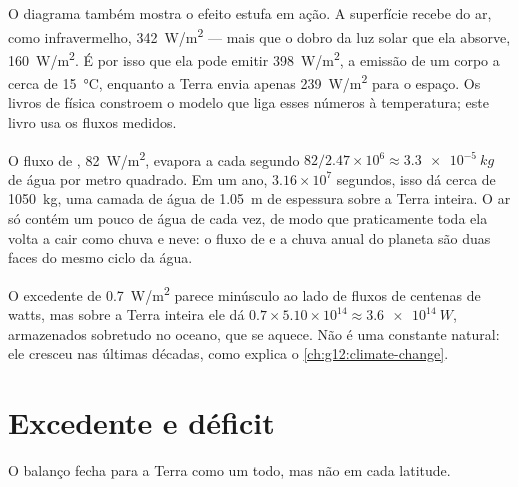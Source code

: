 O diagrama também mostra o efeito estufa em ação. A superfície recebe do
ar, como infravermelho, \qty{342}{W/m^2} --- mais que o dobro da luz solar
que ela absorve, \qty{160}{W/m^2}. É por isso que ela pode emitir
\qty{398}{W/m^2}, a emissão de um corpo a cerca de \qty{15}{\degreeCelsius},
enquanto a Terra envia apenas \qty{239}{W/m^2} para o espaço. Os livros de
física constroem o modelo que liga esses números à temperatura; este livro
usa os fluxos medidos.

\begin{example}\label{ex:g10:earth-energy-budget:evaporation}
O fluxo de , \qty{82}{W/m^2}, evapora a cada segundo
$82/2.47\times
10^6 \approx \qty{3.3e-5}{kg}$ de água por metro quadrado.
Em um ano, $3.16\times10^7$ segundos, isso dá cerca de \qty{1050}{kg}, uma
camada de água de \qty{1.05}{m} de espessura sobre a Terra inteira. O ar
só contém um pouco de água de cada vez, de modo que praticamente toda ela
volta a cair como chuva e neve: o fluxo de  e a chuva anual do
planeta são duas faces do mesmo ciclo da água.
\end{example}

\begin{remark}[O desequilíbrio]\label{rem:g10:earth-energy-budget:imbalance}
O excedente de \qty{0.7}{W/m^2} parece minúsculo ao lado de fluxos de
centenas de watts, mas sobre a Terra inteira ele dá $0.7 \times 5.10\times10^{14} \approx
\qty{3.6e14}{W}$, armazenados sobretudo no oceano,
que se aquece. Não é uma constante natural: ele cresceu nas últimas
décadas, como explica o \cref{ch:g12:climate-change}.
\end{remark}

\section{Excedente e déficit}

O balanço fecha para a Terra como um todo, mas não em cada latitude.

